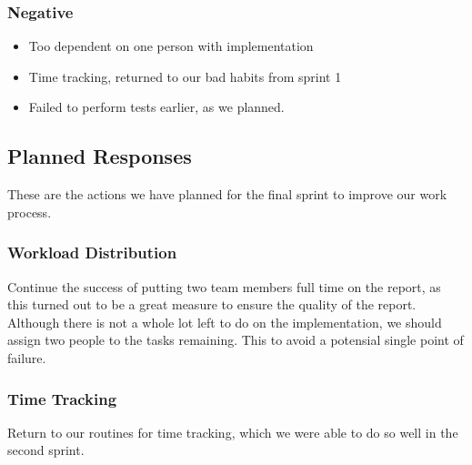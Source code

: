 \subsubsection{Negative}

\begin{itemize}
\item Too dependent on one person with implementation
\item Time tracking, returned to our bad habits from sprint 1
\item Failed to perform tests earlier, as we planned.
\end{itemize}

\subsection{Planned Responses}
These are the actions we have planned for the final sprint to improve our work process.

\subsubsection{Workload Distribution}
Continue the success of putting two team members full time on the report, as this turned out to be a great measure to ensure the quality of the report. Although there is not a whole lot left to do on the implementation, we should assign two people to the tasks remaining. This to avoid a potensial single point of failure.

\subsubsection{Time Tracking}
Return to our routines for time tracking, which we were able to do so well in the second sprint.


